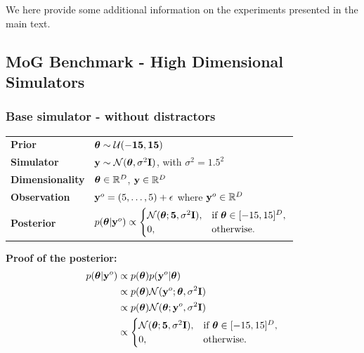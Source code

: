 We here provide some additional information on the experiments presented in the main text.

\subsection{MoG Benchmark - High Dimensional Simulators}

\subsubsection{Base simulator - without distractors}

\begin{tabular}{@{}ll@{}}
  \textbf{Prior} & $\boldsymbol{\theta} \sim \mathcal{U}(-\mathbf{15}, \mathbf{15})$ \\ [5pt]
  \textbf{Simulator} & $\mathbf{y} \sim \mathcal{N}(\boldsymbol{\theta}, \sigma^2 \mathbf{I}) \label{eq:mog_base}$, with $\sigma^2 = 1.5^2$ \\ [5pt]
  \textbf{Dimensionality} & $\boldsymbol{\theta} \in \mathbb{R}^{D}$, $\mathbf{y} \in \mathbb{R}^{D}$ \\ [5pt]
  \textbf{Observation} & $\mathbf{y}^o = (5, \ldots, 5) + \epsilon$ where $\mathbf{y}^o \in \mathbb{R}^D$ \\ [5pt]
  \textbf{Posterior} & $ p(\boldsymbol{\theta} | \mathbf{y}^o) \propto
                                    \begin{cases}
                                      \mathcal{N}(\boldsymbol{\theta}; \mathbf{5}, \sigma^2 \mathbf{I}), & \text{if } \boldsymbol{\theta} \in [-15, 15]^D, \\
                                      0, & \text{otherwise}.
                                    \end{cases} $ \\ [5pt]
\end{tabular}

\textbf{Proof of the posterior:}
%
\begin{align}
  p(\boldsymbol{\theta} | \mathbf{y}^o) &\propto p(\boldsymbol{\theta}) p(\mathbf{y}^o | \boldsymbol{\theta}) \label{eq:mog_base_posterior-1} \\
                  &\propto p(\boldsymbol{\theta}) \mathcal{N}(\mathbf{y}^o; \boldsymbol{\theta}, \sigma^2 \mathbf{I}) \label{eq:mog_base_posterior-2} \\
                  &\propto p(\boldsymbol{\theta}) \mathcal{N}(\boldsymbol{\theta}; \mathbf{y}^o, \sigma^2 \mathbf{I}) \label{eq:mog_base_posterior-3} \\
                  &\propto
                    \begin{cases}
                      \mathcal{N}(\boldsymbol{\theta}; \mathbf{5}, \sigma^2 \mathbf{I}), & \text{if } \boldsymbol{\theta} \in [-15, 15]^D, \\
                      0, & \text{otherwise}.
                    \end{cases} \label{eq:mog_base_posterior}
\end{align}

